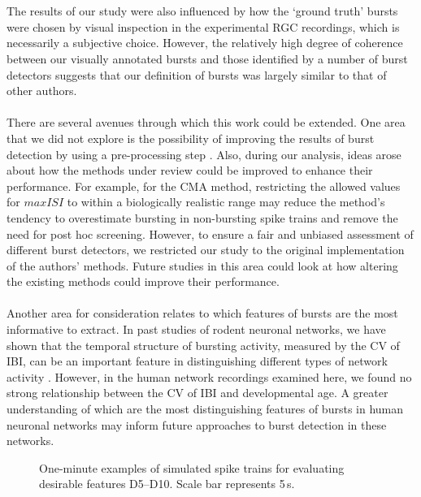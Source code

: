 \documentclass[12pt, titlepage]{article}
\renewcommand{\baselinestretch}{1.66}
\begin{document}
	\\ \\The results of our study were also influenced by how the `ground truth' bursts were chosen by visual inspection in the experimental RGC recordings, which is necessarily a subjective choice. However, the relatively high degree of coherence between our visually annotated bursts and those identified by a number of burst detectors suggests that our definition of bursts was largely similar to that of other authors.
	\\ \\There are several avenues through which this work could be extended. One area that we did not explore is the possibility of improving the results of burst detection by using a pre-processing step \cite{Martens2014}. Also, during our analysis, ideas arose about how the methods under review could be improved to enhance their performance. For example, for the CMA method, restricting the allowed values for $maxISI$ to within a biologically realistic range may reduce the method's tendency to overestimate bursting in non-bursting spike trains and remove the need for post hoc screening. However, to ensure a fair and unbiased assessment of different burst detectors, we restricted our study to the original implementation of the authors' methods. Future studies in this area could look at how altering the existing methods could improve their performance. 
	\\ \\ Another area for consideration relates to which features of bursts are the most informative to extract. In past studies of rodent neuronal networks, we have shown that the temporal structure of bursting activity, measured by the CV of IBI, can be an important feature in distinguishing different types of network activity \cite{Charlesworth2015}. However, in the human network recordings examined here, we found no strong relationship between the CV of IBI and developmental age. A greater understanding of which are the most distinguishing features of bursts in human neuronal networks may inform future approaches to burst detection in these networks. 
	\pagebreak 
		 
		
			\pagebreak 
	\listoffigures
\pagebreak	\listoftables
	\clearpage
\renewcommand{\baselinestretch}{1.4}\normalsize
		\begin{figure}[h]
			\centering
			\caption{One-minute examples of simulated spike trains for evaluating desirable features D5--D10. Scale bar represents 5$\,$s.}
			\label{sim_egs}
		\end{figure}
\end{document}
